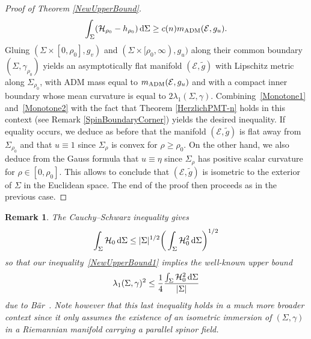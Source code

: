 \documentclass[10pt,a4paper]{amsart}
\numberwithin{equation}{section}
\newtheorem{Remark}[Theorem]{Remark}
\begin{document}
\begin{proof}[Proof of Theorem \ref{NewUpperBound}]
\begin{gather}\label{Monotone2}
\int_{\Sigma}(\mathcal{H}_{\rho_0}-h_{\rho_0})\,{\rm d}\Sigma\geq c(n)m_{\rm ADM}(\mathcal{E},g_u).
\end{gather}
Gluing $(\Sigma\times[0,\rho_0],g_v)$ and $(\Sigma\times[\rho_0,\infty),g_u)$ along their common boundary $(\Sigma,\gamma_{\rho_0})$ yields an asymptotically flat manifold $(\mathcal{E},\widetilde{g})$ with Lipschitz metric along $\Sigma_{\rho_0}$, with ADM mass equal to $m_{\rm ADM}(\mathcal{E},g_u)$ and with a compact inner boundary whose mean curvature is equal to $2\lambda_1(\Sigma,\gamma)$. Combining~\eqref{Monotone1} and~\eqref{Monotone2} with the fact that Theorem \ref{HerzlichPMT-n} holds in this context (see Remark \ref{SpinBoundaryCorner}) yields the desired inequality. If equality occurs, we deduce as before that the manifold $(\mathcal{E},\widetilde{g})$ is flat away from $\Sigma_{\rho_0}$ and that $u\equiv 1$ since $\Sigma_\rho$ is convex for $\rho\geq \rho_0$. On the other hand, we also deduce from the Gauss formula that $u\equiv \eta$ since $\Sigma_\rho$ has positive scalar curvature for $\rho\in[0,\rho_0]$. This allows to conclude that $(\mathcal{E},\widetilde{g})$ is isometric to the exterior of $\Sigma$ in the Euclidean space. The end of the proof then proceeds as in the previous case.
\end{proof}


\begin{Remark}
The Cauchy--Schwarz inequality gives
\begin{gather*}
\int_\Sigma \mathcal{H}_0\,{\rm d}\Sigma\leq |\Sigma|^{1/2}\bigg(\int_\Sigma \mathcal{H}_0^2\,{\rm d}\Sigma\bigg)^{1/2}
\end{gather*}
so that our inequality~\eqref{NewUpperBound1} implies the well-known upper bound
\begin{gather*}%
\lambda_1(\Sigma,\gamma)^2\leq\frac{1}{4}
\frac{\int_\Sigma \mathcal{H}_0^2\,{\rm d}\Sigma}{|\Sigma|}
\end{gather*}
due to B\"ar~\cite{Bar1}. Note however that this last inequality holds in a much more broader context since it only assumes the existence of an isometric immersion of $(\Sigma,\gamma)$ in a Riemannian manifold carrying a parallel spinor field.
\end{Remark}
\end{document}
